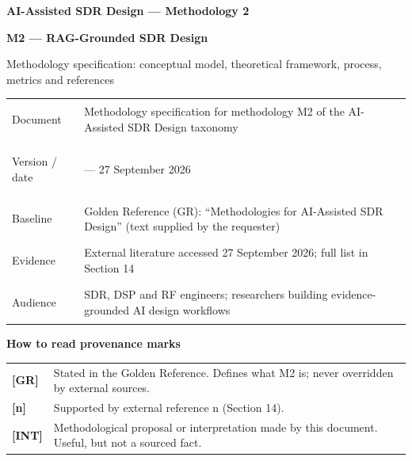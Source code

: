 \documentclass[11pt,a4paper]{article}
\begin{document}
\begin{titlepage}
\thispagestyle{empty}
\noindent\colorbox{accent}{\makebox[\dimexpr\textwidth-2\fboxsep][l]{\rule{0pt}{4pt}}}
\vspace*{30mm}

{\sffamily\bfseries\color{muted} AI-Assisted SDR Design --- Methodology 2\par}
\vspace{4mm}
{\raggedright{}\sffamily\bfseries\fontsize{26}{31}\selectfont\color{ink} M2 --- RAG-Grounded SDR Design\par}
\vspace{5mm}
{\large\color{muted} Methodology specification: conceptual model, theoretical framework, process, metrics and references\par}
\vspace{14mm}
{\small\begin{tabular}{@{}>{\bfseries\sffamily\raggedright\arraybackslash}p{}>{\raggedright\arraybackslash}p{}@{}}
Document & Methodology specification for methodology M2 of the AI-Assisted SDR Design taxonomy \\[3pt]
Version / date & 1.0 --- 27 September 2026 \\[3pt]
Baseline & Golden Reference (GR): ``Methodologies for AI-Assisted SDR Design'' (text supplied by the requester) \\[3pt]
Evidence & External literature accessed 27 September 2026; full list in Section 14 \\[3pt]
Audience & SDR, DSP and RF engineers; researchers building evidence-grounded AI design workflows \\[3pt]
\end{tabular}}
\vspace{10mm}

{\sffamily\bfseries How to read provenance marks\par}
\vspace{2mm}
\begin{tcolorbox}[enhanced,colback=shade,boxrule=0pt,sharp corners,left=6pt,right=6pt]
{\small\begin{tabular}{@{}p{}p{}@{}}
\textbf{[GR]} & Stated in the Golden Reference. Defines what M2 is; never overridden by external sources. \\[2pt]
\textbf{[n]} & Supported by external reference n (Section 14). \\[2pt]
\textbf{[INT]} & Methodological proposal or interpretation made by this document. Useful, but not a sourced fact. \\[2pt]
\end{tabular}}
\end{tcolorbox}
\end{titlepage}
\end{document}
